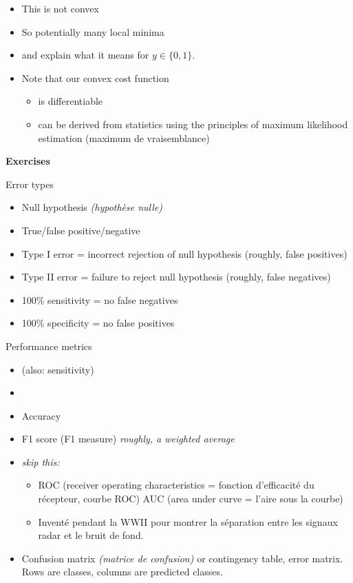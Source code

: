\begin{itemize}
\item This is not convex
\item So potentially many local minima
\item {} and explain what it means for $y\in\{0,1\}$.
\item Note that our convex cost function
  \begin{itemize}
  \item is differentiable
  \item can be derived from statistics using the principles of maximum
    likelihood estimation (maximum de vraisemblance)
  \end{itemize}
\end{itemize}

\textbf{Exercises}

Error types
\begin{itemize}
\item Null hypothesis \textit{(hypothèse nulle)}
\item True/false positive/negative
\item Type I error = incorrect rejection of null hypothesis (roughly, false positives)
\item Type II error = failure to reject null hypothesis (roughly, false negatives)
\item 100\% sensitivity = no false negatives
\item 100\% specificity = no false positives
\end{itemize}


Performance metrics
\begin{itemize}
\item {} (also: sensitivity)
\item {}
\item Accuracy
\item F1 score (F1 measure) \hspace{2mm} \textit{roughly, a weighted average}
\item \textit{skip this:}
  \begin{itemize}
  \item ROC (receiver operating characteristics = fonction
    d’efficacité du récepteur, courbe ROC) AUC (area under curve =
    l'aire sous la courbe)
  \item Inventé pendant la WWII pour montrer la séparation entre les
    signaux radar et le bruit de fond.
  \end{itemize}
\item Confusion matrix \textit{(matrice de confusion)} or contingency
  table, error matrix. Rows are classes, columns are predicted
  classes.
\end{itemize}

